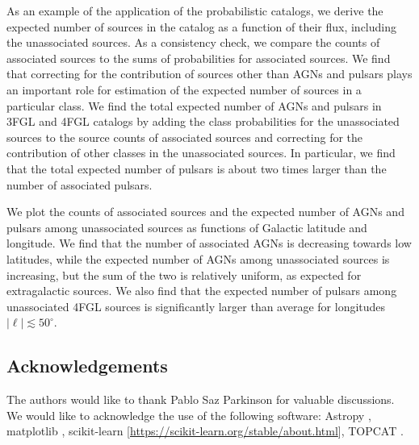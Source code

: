 As an example of the application of the probabilistic catalogs, we derive the expected number of sources in the catalog as a function of their flux, including the unassociated sources.
As a consistency check, we compare the counts of associated sources to the sums of probabilities for associated sources.
We find that correcting for the contribution of sources other than AGNs and pulsars plays an important role for estimation of the expected number of sources in a particular class.
We find the total expected number of AGNs and pulsars in 3FGL and 4FGL catalogs by adding the class probabilities for the unassociated sources to the source counts of associated sources and correcting for the contribution of other classes in the unassociated sources.
In particular, we find that the total expected number of pulsars is about two times larger than the number of associated pulsars.

We plot the counts of associated sources and the expected number of AGNs and pulsars among unassociated sources
as functions of Galactic latitude and longitude.
We find that the number of associated AGNs is decreasing towards low latitudes, while the expected number of AGNs among unassociated sources is increasing, but the sum of the two is relatively uniform, as expected for extragalactic sources.
We also find that the expected number of pulsars among unassociated 4FGL sources is significantly larger than average for longitudes 
$|\ell | \lesssim 50^\circ$.




\subsection*{Acknowledgements}

The authors would like to thank Pablo Saz Parkinson for valuable discussions.
We would like to acknowledge the use of the following software:
Astropy \citep[\url{http://www.astropy.org},][]{2013A&A...558A..33A}, 
matplotlib \citep{Hunter:2007}, 
scikit-learn [\url{https://scikit-learn.org/stable/about.html}], 
TOPCAT \citep{2005ASPC..347...29T}.

